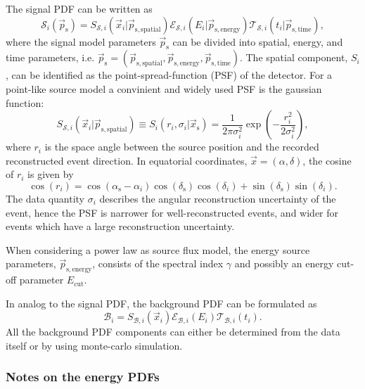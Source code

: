 \documentclass{article}
\newcommand{\ps}{\vec{p}_{\mathrm{s}}}
\newcommand{\xs}{\vec{x}_{\mathrm{s}}}
\begin{document}
The signal PDF can be written as
\begin{equation}
 \mathcal{S}_i(\ps) = S_{\mathcal{S},i}(\vec{x}_i|\vec{p}_{\mathrm{s,spatial}}) \mathcal{E}_{\mathcal{S},i}(E_i|\vec{p}_{\mathrm{s,energy}}) \mathcal{T}_{\mathcal{S},i}(t_i|\vec{p}_{\mathrm{s,time}}),
 \label{eq:Si}
\end{equation}
where the signal model parameters $\ps$ can be divided into spatial, energy, and
time parameters, i.e. $\vec{p}_{\mathrm{s}} = (\vec{p}_{\mathrm{s,spatial}},
\vec{p}_{\mathrm{s,energy}}, \vec{p}_{\mathrm{s,time}})$. The spatial component,
$S_i$, can be identified as the point-spread-function (PSF) of the detector.
For a point-like source model a convinient and widely used PSF is the gaussian
function:
\begin{equation}
 S_{\mathcal{S},i}(\vec{x}_i|\vec{p}_{\mathrm{s,spatial}}) \equiv S_i(r_i,\sigma_i|\xs) = \frac{1}{2\pi\sigma_i^2}\exp\left({-\frac{r_i^2}{2\sigma_i^2}}\right),
\end{equation}
where $r_i$ is the space angle between the source position and the recorded
reconstructed event direction. In equatorial coordinates,
$\vec{x} = (\alpha,\delta)$, the cosine of $r_i$ is given by
\begin{equation}
 \cos(r_i) = \cos(\alpha_{\mathrm{s}} - \alpha_i) \cos(\delta_{\mathrm{s}})\cos({\delta_i}) + \sin(\delta_{\mathrm{s}})\sin(\delta_i).
\end{equation}
The data quantity $\sigma_i$ describes the angular reconstruction uncertainty of
the event, hence the PSF is narrower for well-reconstructed events, and wider
for events which have a large reconstruction uncertainty.

When considering a power law as source flux model, the energy source parameters,
$\vec{p}_{\mathrm{s,energy}}$, consists of the spectral index $\gamma$ and possibly
an energy cut-off parameter $E_{\mathrm{cut}}$.

In analog to the signal PDF, the background PDF can be formulated as
\begin{equation}
 \mathcal{B}_i = S_{\mathcal{B},i}(\vec{x}_i) \mathcal{E}_{\mathcal{B},i}(E_i) \mathcal{T}_{\mathcal{B},i}(t_i).
 \label{eq:Bi}
\end{equation}
All the background PDF components can either be determined from the data itself
or by using monte-carlo simulation.

\subsubsection{Notes on the energy PDFs}
\end{document}
